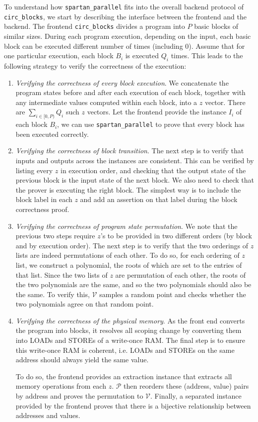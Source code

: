 \documentclass{article}
\newcommand{\code}{\texttt}
\renewcommand{\P}{\mathcal{P}}
\newcommand{\V}{\mathcal{V}}
\begin{document}
To understand how \code{spartan\_parallel} fits into the overall backend protocol of \code{circ\_blocks}, we start by describing the interface between the frontend and the backend. The frontend \code{circ\_blocks} divides a program into $P$ basic blocks of similar sizes. During each program execution, depending on the input, each basic block can be executed different number of times (including 0). Assume that for one particular execution, each block $B_i$ is executed $Q_i$ times. This leads to the following strategy to verify the correctness of the execution:
\begin{enumerate}
    \item \emph{Verifying the correctness of every block execution}. We concatenate the program states before and after each execution of each block, together with any intermediate values computed within each block, into a $z$ vector. There are $\sum_{i\in [0, P)} Q_i$ such $z$ vectors. Let the frontend provide the instance $I_i$ of each block $B_i$, we can use \code{spartan\_parallel} to prove that every block has been executed correctly.
    \item \emph{Verifying the correctness of block transition}. The next step is to verify that inputs and outputs across the instances are consistent. This can be verified by listing every $z$ in execution order, and checking that the output state of the previous block is the input state of the next block. We also need to check that the prover is executing the right block. The simplest way is to include the block label in each $z$ and add an assertion on that label during the block correctness proof.
    \item \emph{Verifying the correctness of program state permutation}. We note that the previous two steps require $z$'s to be provided in two different orders (by block and by execution order). The next step is to verify that the two orderings of $z$ lists are indeed permutations of each other. To do so, for each ordering of $z$ list, we construct a polynomial, the roots of which are set to the entries of that list. Since the two lists of $z$ are permutation of each other, the roots of the two polynomials are the same, and so the two polynomials should also be the same. To verify this, $\V$ samples a random point and checks whether the two polynomials agree on that random point.
    \item \emph{Verifying the correctness of the physical memory}. As the front end converts the program into blocks, it resolves all scoping change by converting them into LOADs and STOREs of a write-once RAM. The final step is to ensure this write-once RAM is coherent, i.e. LOADs and STOREs on the same address should always yield the same value.
    
    To do so, the frontend provides an extraction instance that extracts all memory operations from each $z$. $\P$ then reorders these (address, value) pairs by address and proves the permutation to $\V$. Finally, a separated instance provided by the frontend proves that there is a bijective relationship between addresses and values.
\end{enumerate}
\end{document}
